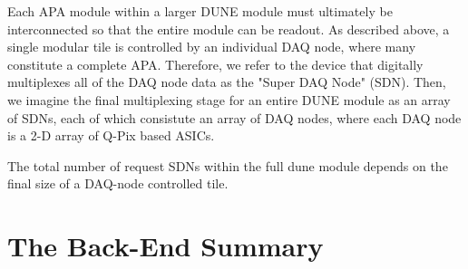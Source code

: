 Each APA module within a larger DUNE module must ultimately be interconnected so that the entire module can be readout.
As described above, a single modular tile is controlled by an individual DAQ node, where many constitute a complete APA.
Therefore, we refer to the device that digitally multiplexes all of the DAQ node data as the "Super DAQ Node" (SDN).
Then, we imagine the final multiplexing stage for an entire DUNE module as an array of SDNs, each of which consistute an array of DAQ nodes, where each DAQ node is a 2-D array of Q-Pix based ASICs.

The total number of request SDNs within the full dune module depends on the final size of a DAQ-node controlled tile.


\section{The Back-End Summary}
